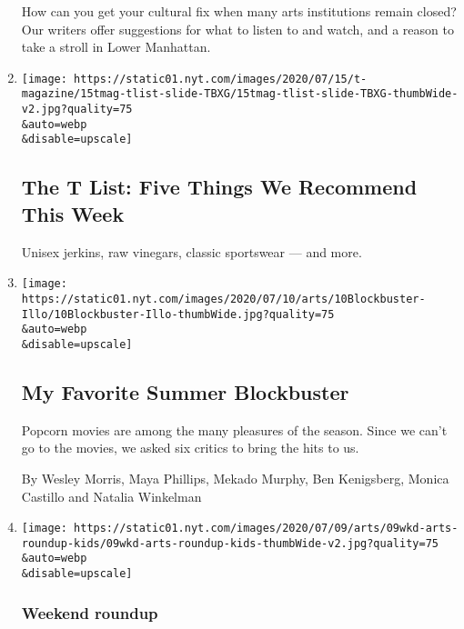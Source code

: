\begin{enumerate}
  How can you get your cultural fix when many arts institutions remain
  closed? Our writers offer suggestions for what to listen to and watch,
  and a reason to take a stroll in Lower Manhattan.
\item
  \href{/2020/07/16/t-magazine/margo-price-album-tlist.html}{}

  \texttt{[image: https://static01.nyt.com/images/2020/07/15/t-magazine/15tmag-tlist-slide-TBXG/15tmag-tlist-slide-TBXG-thumbWide-v2.jpg?quality=75\\\&auto=webp\\\&disable=upscale]}

  \hypertarget{the-t-list-five-things-we-recommend-this-week-2}{%
  \subsection{The T List: Five Things We Recommend This
  Week}\label{the-t-list-five-things-we-recommend-this-week-2}}

  Unisex jerkins, raw vinegars, classic sportswear --- and more.
\item
  \href{/2020/07/09/movies/summer-movies-blockbusters.html}{}

  \texttt{[image: https://static01.nyt.com/images/2020/07/10/arts/10Blockbuster-Illo/10Blockbuster-Illo-thumbWide.jpg?quality=75\\\&auto=webp\\\&disable=upscale]}

  \hypertarget{my-favorite-summer-blockbuster}{%
  \subsection{My Favorite Summer
  Blockbuster}\label{my-favorite-summer-blockbuster}}

  Popcorn movies are among the many pleasures of the season. Since we
  can't go to the movies, we asked six critics to bring the hits to us.

  By Wesley Morris, Maya Phillips, Mekado Murphy, Ben Kenigsberg, Monica
  Castillo and Natalia Winkelman
\item
  \href{/2020/07/09/arts/things-to-do-weekend-coronavirus.html}{}

  \texttt{[image: https://static01.nyt.com/images/2020/07/09/arts/09wkd-arts-roundup-kids/09wkd-arts-roundup-kids-thumbWide-v2.jpg?quality=75\\\&auto=webp\\\&disable=upscale]}

  \hypertarget{weekend-roundup-1}{%
  \subsubsection{Weekend roundup}\label{weekend-roundup-1}}


\end{enumerate}
